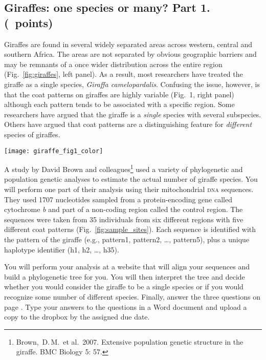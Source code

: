 \documentclass[11pt, addpoints]{exam}
\begin{document}
\subsection*{Giraffes: one species or many? Part 1. (\numpoints\ points)}

Giraffes are found in several widely separated areas across western,
central and southern Africa. The areas are not separated by obvious
geographic barriers and may be remnants of a once wider distribution
across the entire region (Fig.~\ref{fig:giraffes}, left panel). As a result, most
researchers have treated the giraffe as a single species, \textit{Giraffa
camelopardalis}. Confusing the issue, however, is that the coat patterns
on giraffes are highly variable (Fig.~1, right panel) although each
pattern tends to be associated with a specific region. Some researchers
have argued that the giraffe is a \emph{single} species with several
subspecies. Others have argued that coat patterns are a distinguishing
feature for \emph{different} species of giraffes.

\begin{center}
	\texttt{[image: giraffe\_fig1\_color]}
\end{center}

A study by David Brown and colleagues\footnote{Brown,~D.\,M.~et al.~2007.
  Extensive population genetic structure in the giraffe. BMC Biology 5:
  57.} used a variety of phylogenetic and population genetic analyses to
estimate the actual number of giraffe species. You will perform one part
of their analysis using their mitochondrial \textsc{dna} sequences. They used
1707 nucleotides sampled from a protein-encoding gene called cytochrome
\textit{b} and part of a non-coding region called the control region. The
sequences were taken from 35 individuals from six different regions with
five different coat patterns (Fig.~\ref{fig:sample_sites}). Each sequence is identified with
the pattern of the giraffe (e.g., pattern1, pattern2, \ldots{},
pattern5), plus a unique haplotype identifier (h1, h2, \ldots{}, h35).

You will perform your analysis at a website that will align your
sequences and build a phylogenetic tree for you. You will then interpret
the tree and decide whether you would consider the giraffe to be a
single species or if you would recognize some number of different
species. Finally, answer the three questions on page \pageref{sec:questions}. Type your
answers to the questions in a Word document and upload a copy to the dropbox by the assigned due date.
\end{document}
